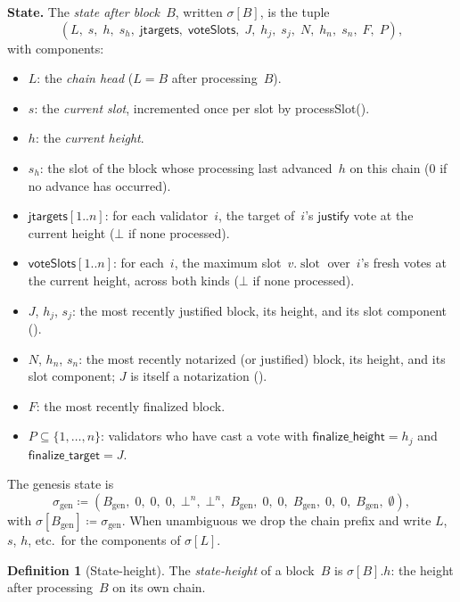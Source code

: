 \ifx\litemode\undefined\documentclass{article}\fi
\newcommand{\genesis}{\ensuremath{B_{\mathrm{gen}}}}
\newcommand{\slot}[0]{\ensuremath{\operatorname{\mathrm{slot}}}}
\newcommand{\just}{\ensuremath{\mathsf{justify}}\xspace}
\newcommand{\finalizeHeight}{\mathsf{finalize\_height}}
\newcommand{\finalizeTarget}{\mathsf{finalize\_target}}
\newcommand{\jtargets}{\mathsf{jtargets}}
\newcommand{\voteSlots}{\mathsf{voteSlots}}
\newcommand{\processSlot}{\textsf{processSlot}\xspace}
\renewcommand{\paragraph}[1]{\vspace{7pt}\noindent\textbf{#1}}
\theoremstyle{plain}
\theoremstyle{definition}
\newtheorem{definition}[theorem]{Definition}
\theoremstyle{remark}
\begin{document}
\paragraph{State.}
The \emph{state after block~$B$}, written $\sigma[B]$, is the tuple
\[
  (L,\; s,\; h,\; s_h,\; \jtargets,\; \voteSlots,\; J,\; h_j,\; s_j,\; N,\; h_n,\; s_n,\; F,\; P),
\]
with components:
\begin{itemize}
  \item $L$: the \emph{chain head} ($L = B$ after processing~$B$).
  \item $s$: the \emph{current slot}, incremented once per slot by \processSlot ().
  \item $h$: the \emph{current height}.
  \item $s_h$: the slot of the block whose processing last advanced~$h$ on this chain ($0$ if no advance has occurred).
  \item $\jtargets[1..n]$: for each validator~$i$, the target of~$i$'s \just vote at the current height ($\bot$ if none processed).
  \item $\voteSlots[1..n]$: for each~$i$, the maximum slot~$v.\slot$ over~$i$'s fresh votes at the current height, across both kinds ($\bot$ if none processed).
  \item $J$, $h_j$, $s_j$: the most recently justified block, its height, and its slot component ().
  \item $N$, $h_n$, $s_n$: the most recently notarized (or justified) block, its height, and its slot component; $J$ is itself a notarization ().
  \item $F$: the most recently finalized block.
  \item $P \subseteq \{1, \ldots, n\}$: validators who have cast a vote with $\finalizeHeight = h_j$ and $\finalizeTarget = J$.
\end{itemize}
The genesis state is
\[
  \sigma_{\mathrm{gen}} \coloneqq (\genesis,\; 0,\; 0,\; 0,\; \bot^n,\; \bot^n,\; \genesis,\; 0,\; 0,\; \genesis,\; 0,\; 0,\; \genesis,\; \emptyset),
\]
with $\sigma[\genesis] \coloneqq \sigma_{\mathrm{gen}}$.
When unambiguous we drop the chain prefix and write $L$, $s$, $h$, etc.\ for the components of $\sigma[L]$.

\begin{definition}[State-height]\label{def:sheight}
The \emph{state-height} of a block~$B$ is $\sigma[B].h$: the height after processing~$B$ on its own chain.
\end{definition}
\end{document}
